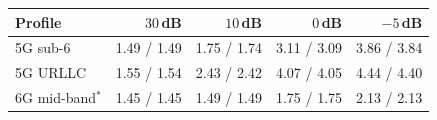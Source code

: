 \begin{tabular}{@{}lrrrr@{}}
\toprule
Profile & $30$\,dB & $10$\,dB & $0$\,dB & $-5$\,dB \\
\midrule
5G sub-6 & 1.49 / 1.49 & 1.75 / 1.74 & 3.11 / 3.09 & 3.86 / 3.84 \\
5G URLLC & 1.55 / 1.54 & 2.43 / 2.42 & 4.07 / 4.05 & 4.44 / 4.40 \\
6G mid-band$^\ast$ & 1.45 / 1.45 & 1.49 / 1.49 & 1.75 / 1.75 & 2.13 / 2.13 \\
\bottomrule
\end{tabular}
